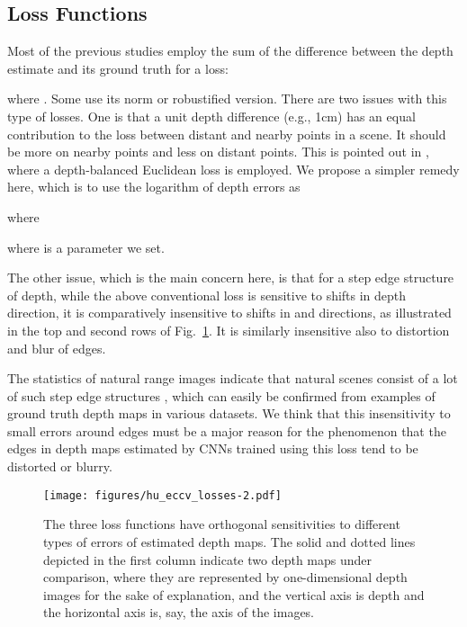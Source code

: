 \documentclass[10pt,twocolumn,letterpaper]{article}
\begin{document}
\subsection{Loss Functions}
\label{sec:losses}

Most of the previous studies employ 
the sum of the difference between the depth estimate  and its ground truth  for a loss: 

where .
Some use its  norm or robustified version. 
There are two issues with this type of losses. One is that a unit depth difference (e.g., 1cm) has an equal contribution to the loss between distant and nearby points in a scene. It should be more on nearby points and less on distant points. This is pointed out in \cite{lee2018single}, where a depth-balanced Euclidean loss is employed.
We propose a simpler remedy here, which is to use 
the logarithm of depth errors as 

where

where  is a parameter we set. 
\begin{comment}
When , the derivative of  with respect to model parameters  is

As seen, for a larger depth value , the effect of  will be reduced by . 
(For depth estimation, a larger depth value tends to produce larger .) 
\end{comment}

The other issue, which is the main concern here, is that for a step edge structure of depth, while the above conventional loss is sensitive to shifts in depth direction, it is comparatively insensitive to shifts in  and  directions, as illustrated in the top and second rows of Fig.~\ref{fig:losses}. 
It is similarly insensitive also to distortion and blur of edges. 

The statistics of natural range images indicate that natural scenes consist of a lot of such step edge structures \cite{huang2000statistics}, which can easily be confirmed from examples of ground truth depth maps in various datasets. 
We think that this insensitivity to small errors around edges must be a major reason for the phenomenon that the edges in depth maps estimated by CNNs trained using this loss tend to be distorted or blurry.

\begin{figure}[t]
\centering
\texttt{[image: figures/hu\_eccv\_losses-2.pdf]}
\caption{The three loss functions have orthogonal sensitivities to different types of errors of estimated depth maps. The solid and dotted lines depicted in the first column indicate two depth maps under comparison, where they are represented by one-dimensional depth images for the sake of explanation, and the vertical axis is depth and the horizontal axis is, say, the  axis of the images.}
\label{fig:losses}
\end{figure}
\end{document}
